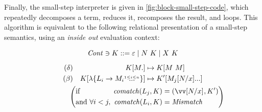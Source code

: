 \documentclass[sigplan,screen]{acmart}
\begin{document}
Finally, the small-step interpreter is given in
\cref{fig:block-small-step-code}, which repeatedly decomposes a term, reduces
it, recomposes the result, and loops.  This algorithm is equivalent to the
following relational presentation of a small-step semantics, using an
\emph{inside out} evaluation context:

\begin{gather*}
  \begin{alignedat}{2}
    \mathit{Cont} &\ni{}& K
    &::= \varepsilon
    \mid N ~ K
    \mid X ~ K
  \end{alignedat}
  \\[1ex]
  \begin{aligned}
    (\delta)&&
    K[M.] &\mapsto K[M ~ M]
    \\
    (\beta)&&
    K[\lambda\{\many[1 \leq i \leq n]{L_i \to M_i}\}]
    &\mapsto
    K'[M_j\many{\subst{x}{N}}]
  \end{aligned}
  \\
  \qquad\qquad
  \left(
    \begin{alignedat}{2}
      &\text{if } &\mathit{comatch}(L_j, K) &= (\vect{\subst{x}{N}}, K')
      \\
      &\text{and } &\forall i < j,~ \mathit{comatch}(L_i, K) &= \mathit{Mismatch}
    \end{alignedat}
  \right)
\end{gather*}




\end{document}
